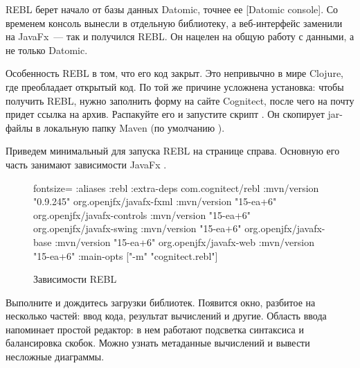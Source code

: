 REBL берет начало от базы данных Datomic, точнее ее [Datomic console]. Со временем консоль вынесли в отдельную библиотеку, а веб-интерфейс заменили на JavaFx~--- так и получился REBL. Он нацелен на общую работу с данными, а не только Datomic.

Особенность REBL в том, что его код закрыт. Это непривычно в мире Clojure, где преобладает открытый код. По той же причине усложнена установка: чтобы получить REBL, нужно заполнить форму на сайте Cognitect, после чего на почту придет ссылка на архив. Распакуйте его и запустите скрипт . Он скопирует jar-файлы в локальную папку Maven (по умолчанию ).

Приведем минимальный  для запуска REBL на странице справа. Основную его часть занимают зависимости JavaFx .


\begin{figure}[ht!]

\begin{english}
  \begin{clojure*}{fontsize=\small}
{:aliases
 {:rebl
  {:extra-deps
    {com.cognitect/rebl          {:mvn/version "0.9.245"}
     org.openjfx/javafx-fxml     {:mvn/version "15-ea+6"}
     org.openjfx/javafx-controls {:mvn/version "15-ea+6"}
     org.openjfx/javafx-swing    {:mvn/version "15-ea+6"}
     org.openjfx/javafx-base     {:mvn/version "15-ea+6"}
     org.openjfx/javafx-web      {:mvn/version "15-ea+6"}}
   :main-opts ["-m" "cognitect.rebl"]}}}
  \end{clojure*}
\end{english}

\captionsetup{labelformat=lis}
\caption{Зависимости REBL}

\label{fig:rebl-deps}

\end{figure}

Выполните  и дождитесь загрузки библиотек. Появится окно, разбитое на несколько частей: ввод кода, результат вычислений и другие. Область ввода напоминает простой редактор: в нем работают подсветка синтаксиса и балансировка скобок. Можно узнать метаданные вычислений и вывести несложные диаграммы.

\pagebreaklarge

\def\urlreblvideo{https://www.youtube.com/watch?v=c52QhiXsmyI}


